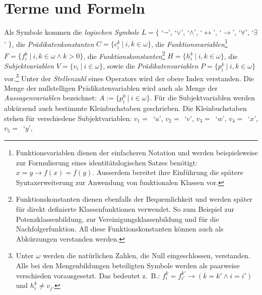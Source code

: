 \documentclass[a4paper,german,10pt,twoside]{book}
\theoremstyle{definition}
\theoremstyle{remark}
\begin{document}
\section{Terme und Formeln} \label{chapter3_section0} \hypertarget{chapter3_section0}{}
Als Symbole kommen die \emph{logischen Symbole} 
$L = \{$ \mbox{`$\neg$'}, \mbox{`$\vee$'}, \mbox{`$\wedge$'}, 
\mbox{`$\leftrightarrow$'}, \mbox{`$\rightarrow$'}, \mbox{`$\forall$'},
\mbox{`$\exists$'} $\}$, die 
\emph{Pr{\"a}dikatenkonstanten}
$C = \{c^k_i~|~i, k \in \omega\}$, die 
\emph{Funktionsvariablen}\footnote{Funktionsvariablen
dienen der einfacheren Notation und werden beispielsweise zur 
Formulierung eines identit{\"a}tslogischen Satzes ben{\"o}tigt: 
$x = y \rightarrow f(x) = f(y)$. 
Ausserdem bereitet ihre Einf{\"u}hrung die sp{\"a}tere Syntaxerweiterung zur 
Anwendung von funktionalen Klassen vor.} 
$F = \{f^k_i~|~i, k \in \omega \land k > 0\}$, die 
\emph{Funktionskonstanten}\footnote{Funktionskonstanten
dienen ebenfalls der Bequemlichkeit und werden sp{\"a}ter f{\"u}r direkt 
definierte Klassenfunktionen verwendet. So zum Beispiel zur 
Potenzklassenbildung, zur Vereinigungsklassenbildung und f{\"u}r die
Nachfolgerfunktion. All diese Funktionskonstanten k{\"o}nnen auch als 
Abk{\"u}rzungen verstanden werden.}
$H = \{h^k_i~|~i, k \in \omega\}$, die 
\emph{Subjektvariablen} 
$V = \{v_i~|~i \in \omega\}$, sowie die
\emph{Pr{\"a}dikatenvariablen}
$P = \{p^k_i~|~i, k \in \omega\}$ vor.\footnote{Unter $\omega$ werden 
die nat{\"u}rlichen Zahlen, die Null eingeschlossen, verstanden. Alle bei 
den Mengenbildungen beteiligten Symbole werden als paarweise
verschieden vorausgesetzt. Das bedeutet z.~B.: 
$f^k_i = f^{k'}_{i'} \rightarrow (k = k' \land i = i')$
und $h^k_i \neq v_j$.} Unter der \emph{Stellenzahl} eines Operators wird
der obere Index verstanden. Die Menge der nullstelligen 
Pr{\"a}dikatenvariablen wird auch als Menge der
\emph{Aussagenvariablen} 
bezeichnet: $A := \{p_i^0~|~i \in \omega \}$. 
F{\"u}r die Subjektvariablen werden abk{\"u}rzend auch bestimmte Kleinbuchstaben
geschrieben. Die Kleinbuchstaben stehen f{\"u}r verschiedene 
Subjektvariablen: \mbox{$v_1 = $ `$u$'}, \mbox{$v_2 = $ `$v$'}, 
\mbox{$v_3 = $ `$w$'}, \mbox{$v_4 = $ `$x$'}, \mbox{$v_5 = $ `$y$'},
\end{document}
